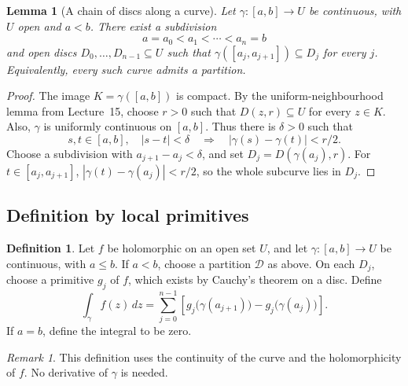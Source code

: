\documentclass[11pt]{article}
\theoremstyle{plain}
\newtheorem{lemma}[theorem]{Lemma}
\theoremstyle{definition}
\newtheorem{definition}[theorem]{Definition}
\theoremstyle{remark}
\newtheorem*{remark}{Remark}
\numberwithin{equation}{section}
\begin{document}
\begin{lemma}[A chain of discs along a curve]\label{lem:partition-existence}
Let $\gamma\colon[a,b]\to U$ be continuous, with $U$ open and $a<b$.
There exist a subdivision
\[
 a=a_0<a_1<\cdots<a_n=b
\]
and open discs $D_0,\ldots,D_{n-1}\subseteq U$ such that
$\gamma([a_j,a_{j+1}])\subseteq D_j$ for every $j$.
Equivalently, every such curve admits a partition.
\end{lemma}
\begin{proof}
The image $K=\gamma([a,b])$ is compact. By
the uniform-neighbourhood lemma from Lecture~15, choose $r>0$ such that
$D(z,r)\subseteq U$ for every $z\in K$.
Also, $\gamma$ is uniformly continuous on $[a,b]$. Thus there is
$\delta>0$ such that
\[
 s,t\in[a,b],\quad |s-t|<\delta\quad\Longrightarrow\quad
 |\gamma(s)-\gamma(t)|<r/2.
\]
Choose a subdivision with $a_{j+1}-a_j<\delta$, and set
$D_j=D(\gamma(a_j),r)$. For $t\in[a_j,a_{j+1}]$,
$|\gamma(t)-\gamma(a_j)|<r/2$, so the whole subcurve lies in $D_j$.
\end{proof}

\subsection{Definition by local primitives}
\begin{definition}\label{def:continuous-integral}
Let $f$ be holomorphic on an open set $U$, and let
$\gamma\colon[a,b]\to U$ be continuous, with $a\leq b$.
If $a<b$, choose a partition $\mathscr{D}$ as above. On each $D_j$,
choose a primitive $g_j$ of $f$, which exists by Cauchy's theorem on
a disc. Define
\begin{equation}\label{eq:continuous-integral}
 \boxed{\displaystyle
 \int_\gamma f(z)\,dz
 =\sum_{j=0}^{n-1}\left[
 g_j\bigl(\gamma(a_{j+1})\bigr)-g_j\bigl(\gamma(a_j)\bigr)
 \right].}
\end{equation}
If $a=b$, define the integral to be zero.
\end{definition}

\begin{remark}
This definition uses the continuity of the curve and the holomorphicity
of $f$. No derivative of $\gamma$ is needed.
\end{remark}
\end{document}
